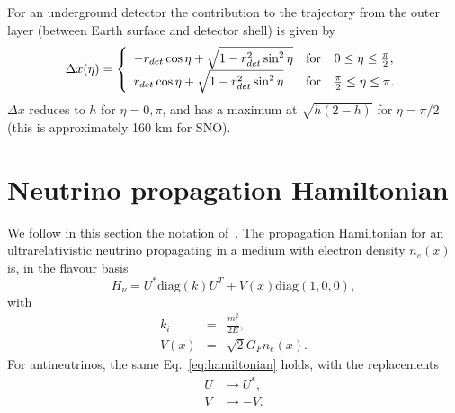 \documentclass{article}
\newcommand{\de}[0]{\text{d}}
\begin{document}
For an underground detector the contribution to the trajectory from the outer layer (between Earth surface and detector shell) is given by
\begin{equation}
	 \Delta x(\eta) = \left\{ \begin{array}{l c c}
		-r_{det} \cos\eta + \sqrt{1 - r_{det}^2 \sin^2 \eta} & \text{for} & 0 \leq \eta \leq \frac{\pi}{2}, \\
		r_{det} \cos\eta + \sqrt{1 - r_{det}^2 \sin^2 \eta} & \text{for} & \frac{\pi}{2} \leq \eta \leq \pi.
	\end{array} \right.
\end{equation}
$\Delta x$ reduces to $h$ for $\eta=0, \pi$, and has a maximum at $\sqrt{h(2-h)}$ for $\eta=\pi/2$ (this is approximately 160 km for SNO).

%

\section{Neutrino propagation Hamiltonian}
We follow in this section the notation of~\cite{Fantini:2018itu}.
The propagation Hamiltonian for an ultrarelativistic neutrino propagating in a medium with electron density $n_e(x)$ is, in the flavour basis
\begin{equation}\label{eq:hamiltonian}
	H_\nu = U^* \text{diag}(k) U^T + V(x) \text{diag}(1,0,0),
\end{equation}
with
\begin{eqnarray}
	k_i &=& \frac{m_i^2}{2E},\\
	V(x) &=& \sqrt{2}G_F n_e(x).
\end{eqnarray}
For antineutrinos, the same Eq.~\ref{eq:hamiltonian} holds, with the replacements
\begin{eqnarray}
	U &\rightarrow U^*,\\
	V &\rightarrow -V.
\end{eqnarray}
\end{document}
